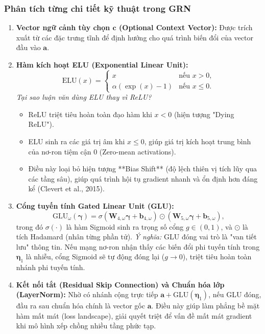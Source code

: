 \documentclass[12pt,a4paper,oneside]{article}
\begin{document}
\subsubsection{Phân tích từng chi tiết kỹ thuật trong GRN}
\begin{enumerate}
    \item \textbf{Vector ngữ cảnh tùy chọn $\mathbf{c}$ (Optional Context Vector):} Được trích xuất từ các đặc trưng tĩnh để định hướng cho quá trình biến đổi của vector đầu vào $\mathbf{a}$.
    \item \textbf{Hàm kích hoạt ELU (Exponential Linear Unit):}
    \begin{equation}
        \text{ELU}(x) = \begin{cases} x & \text{nếu } x > 0, \\ \alpha(\exp(x) - 1) & \text{nếu } x \le 0. \end{cases}
        \label{eq:elu}
    \end{equation}
    \textit{Tại sao luận văn dùng ELU thay vì ReLU?}
    \begin{itemize}
        \item ReLU triệt tiêu hoàn toàn đạo hàm khi $x < 0$ (hiện tượng "Dying ReLU").
        \item ELU sinh ra các giá trị âm khi $x \le 0$, giúp giá trị kích hoạt trung bình của nơ-ron tiệm cận 0 (Zero-mean activations).
        \item Điều này loại bỏ hiện tượng **Bias Shift** (độ lệch thiên vị tích lũy qua các tầng sâu), giúp quá trình hội tụ gradient nhanh và ổn định hơn đáng kể (Clevert et al., 2015).
    \end{itemize}

    \item \textbf{Cổng tuyến tính Gated Linear Unit (GLU):}
    \begin{equation}
        \text{GLU}_{\omega}(\bm{\gamma}) = \sigma\!\left(\mathbf{W}_{4,\omega}\bm{\gamma} + \mathbf{b}_{4,\omega}\right) \odot \left(\mathbf{W}_{5,\omega}\bm{\gamma} + \mathbf{b}_{5,\omega}\right),
        \label{eq:glu}
    \end{equation}
    trong đó $\sigma(\cdot)$ là hàm Sigmoid sinh ra trọng số cổng $g \in (0, 1)$, và $\odot$ là tích Hadamard (nhân từng phần tử).
    \textit{Ý nghĩa:} GLU đóng vai trò là "van tiết lưu" thông tin. Nếu mạng nơ-ron nhận thấy các biến đổi phi tuyến tính trong $\bm{\eta}_1$ là nhiễu, cổng Sigmoid sẽ tự động đóng lại ($g \rightarrow 0$), triệt tiêu hoàn toàn nhánh phi tuyến tính.

    \item \textbf{Kết nối tắt (Residual Skip Connection) và Chuẩn hóa lớp (LayerNorm):}
    Nhờ có nhánh cộng trực tiếp $\mathbf{a} + \text{GLU}(\bm{\eta}_1)$, nếu GLU đóng, đầu ra sau chuẩn hóa chính là vector gốc $\mathbf{a}$. Điều này giúp làm phẳng bề mặt hàm mất mát (loss landscape), giải quyết triệt để vấn đề mất mát gradient khi mô hình xếp chồng nhiều tầng phức tạp.
\end{enumerate}
\end{document}
